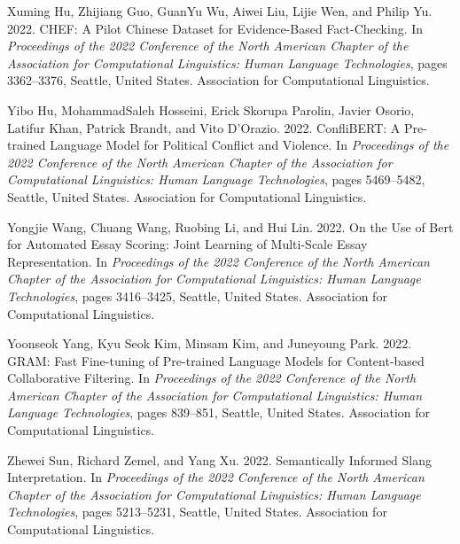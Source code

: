 \documentclass[11pt]{article}
\begin{document}
\begin{thebibliography}{50}
\bibitem{}
Xuming Hu, Zhijiang Guo, GuanYu Wu, Aiwei Liu, Lijie Wen, and Philip Yu. 2022. CHEF: A Pilot Chinese Dataset for Evidence-Based Fact-Checking. In \emph{Proceedings of the 2022 Conference of the North American Chapter of the Association for Computational Linguistics: Human Language Technologies}, pages 3362–3376, Seattle, United States. Association for Computational Linguistics.

\bibitem{}
Yibo Hu, MohammadSaleh Hosseini, Erick Skorupa Parolin, Javier Osorio, Latifur Khan, Patrick Brandt, and Vito D’Orazio. 2022. ConfliBERT: A Pre-trained Language Model for Political Conflict and Violence. In \emph{Proceedings of the 2022 Conference of the North American Chapter of the Association for Computational Linguistics: Human Language Technologies}, pages 5469–5482, Seattle, United States. Association for Computational Linguistics.

\bibitem{}
Yongjie Wang, Chuang Wang, Ruobing Li, and Hui Lin. 2022. On the Use of Bert for Automated Essay Scoring: Joint Learning of Multi-Scale Essay Representation. In \emph{Proceedings of the 2022 Conference of the North American Chapter of the Association for Computational Linguistics: Human Language Technologies}, pages 3416–3425, Seattle, United States. Association for Computational Linguistics.

\bibitem{}
Yoonseok Yang, Kyu Seok Kim, Minsam Kim, and Juneyoung Park. 2022. GRAM: Fast Fine-tuning of Pre-trained Language Models for Content-based Collaborative Filtering. In \emph{Proceedings of the 2022 Conference of the North American Chapter of the Association for Computational Linguistics: Human Language Technologies}, pages 839–851, Seattle, United States. Association for Computational Linguistics.

\bibitem{}
Zhewei Sun, Richard Zemel, and Yang Xu. 2022. Semantically Informed Slang Interpretation. In \emph{Proceedings of the 2022 Conference of the North American Chapter of the Association for Computational Linguistics: Human Language Technologies}, pages 5213–5231, Seattle, United States. Association for Computational Linguistics.






\end{thebibliography}
\end{document}
